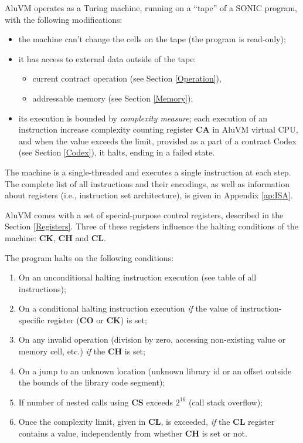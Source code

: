\documentclass[9pt,oneside]{amsart}
\begin{document}
\begin{multicols}{2}
AluVM operates as a Turing machine, running on a ``tape'' of a SONIC program,
with the following modifications:

\begin{itemize}
\item the machine can't change the cells on the tape (the program is read-only);
\item it has access to external data outside of the tape:
    \begin{itemize}
    \item current contract operation (see Section \ref{Operation}),
    \item addressable memory (see Section \ref{Memory});
    \end{itemize}
\item its execution is bounded by \emph{complexity measure};
    each execution of an instruction increase complexity counting register
    \textbf{CA} in AluVM virtual CPU, and when the value exceeds the limit,
    provided as a part of a contract Codex (see Section \ref{Codex}),
    it halts, ending in a failed state.
\end{itemize}

The machine is a single-threaded and executes a single instruction at each step.
The complete list of all instructions and their encodings,
as well as information about registers (i.e., instruction set architecture),
is given in Appendix \ref{ap:ISA}.

AluVM comes with a set of special-purpose control registers,
described in the Section \ref{Registers}.
Three of these registers influence the halting conditions of the machine:
\textbf{CK}, \textbf{CH} and \textbf{CL}.

The program halts on the following conditions:
\noindent
\begin{enumerate}
\item On an unconditional halting instruction execution (see table of all instructions);
\item On a conditional halting instruction execution
   \emph{if} the value of instruction-specific register (\textbf{CO} or \textbf{CK}) is set;
\item On any invalid operation (division by zero, accessing non-existing value or memory cell, etc.)
   \emph{if} the \textbf{CH} is set;
\item On a jump to an unknown location
   (unknown library id or an offset outside the bounds of the library code segment);
\item If number of nested calls using \textbf{CS} exceeds $2^{16}$
   (call stack overflow);
\item Once the complexity limit, given in \textbf{CL}, is exceeded,
   \emph{if} the \textbf{CL} register contains a value,
   independently from whether \textbf{CH} is set or not.
\end{enumerate}


\end{multicols}
\end{document}
